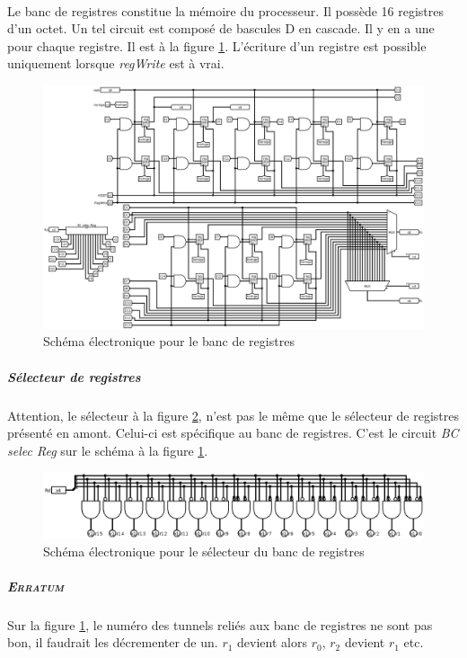\paragraph{}{
	Le banc de registres constitue la mémoire du processeur. Il possède
	16 registres d'un octet. Un tel circuit	est composé de bascules
	D en cascade. Il y en a une pour chaque registre. Il est à la figure
	\ref{banc_reg_circ}. \newline
	L'écriture d'un registre est possible uniquement lorsque \textit{regWrite}
	est à vrai.
}

\begin{figure}
	\label{banc_reg_circ}
	\centering
	\includegraphics[scale=0.4,angle=90,origin=c]{circuits/banc_reg.png}
	\caption{Sch\'{e}ma \'{e}lectronique pour le banc de registres}
\end{figure}

	\subparagraph{Sélecteur de registres}{
		Attention, le sélecteur à la figure \ref{banc_reg_selec_circ}, n'est
		pas le même que le sélecteur de registres présenté en amont.
		Celui-ci est spécifique au banc de registres. C'est le circuit
		\textit{BC selec Reg} sur le schéma à la figure \ref{banc_reg_circ}.
	}

\begin{figure}
	\centering
	\includegraphics[scale=0.35,origin=c]{circuits/banc_reg_selec.png}
	\caption{ \label{banc_reg_selec_circ} Sch\'{e}ma \'{e}lectronique pour le sélecteur du banc de registres}
\end{figure}

\subparagraph{\textsc{Erratum}}{
	Sur la figure \ref{banc_reg_circ}, le numéro des tunnels reliés aux banc de
	registres ne sont pas bon, il faudrait les décrementer de un. $r_{1}$
	devient alors $r_{0}$, $r_{2}$ devient $r_{1}$ etc.
}